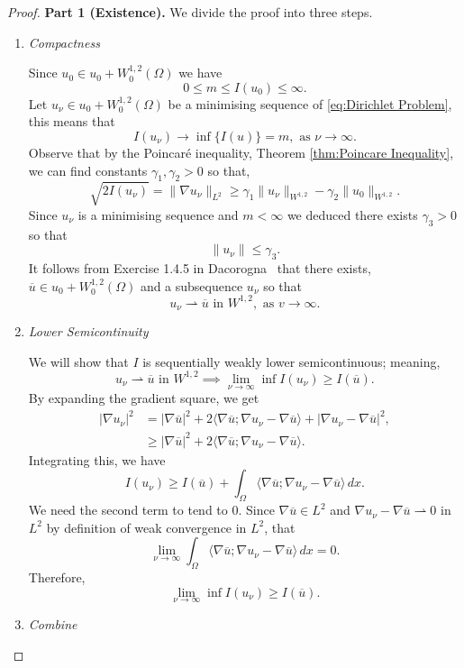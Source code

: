 \begin{proof}
    \textbf{Part 1 (Existence).}
    We divide the proof into three steps.
    
    \begin{enumerate}
        \item[(i)] \textit{Compactness}
        
        Since $u_0 \in u_0 + W_0^{1,2}(\Omega)$ we have
        $$
        	0 \le m \le I(u_0) \le \infty.
        $$
        Let $u_\nu \in u_0 + W_0^{1,2}(\Omega)$ be a minimising sequence of \eqref{eq:Dirichlet Problem}, this means that
        $$
        I(u_\nu) \rightarrow \inf\{I(u)\} = m, \text{ as } \nu\rightarrow \infty.
        $$
        Observe that by the Poincar\'e inequality, Theorem \ref{thm:Poincare Inequality}, we can find constants $\gamma_1,\gamma_2>0$ so that,
        $$
        \sqrt{2I(u_\nu)} = \|\nabla u_\nu\|_{L^2} \ge \gamma_1\|u_\nu\|
        _{W^{1,2}} - \gamma_2\|u_0\|_{W^{1,2}}.
        $$
        Since $u_\nu$ is a minimising sequence and $m<\infty$ we deduced there exists $\gamma_3 > 0$ so that
        $$
        \|u_\nu\| \le \gamma_3.
        $$
        It follows from Exercise 1.4.5 in Dacorogna~\cite[p.~47]{dacorogna} that there exists, $\overline{u} \in u_0 + W_0^{1,2}(\Omega)$ and a subsequence $u_\nu$ so that
        $$
        u_\nu \rightharpoonup \overline{u} \text{ in } W^{1,2}, \text{ as }v 
        \rightarrow \infty.
        $$
        
        \item[(ii)] \textit{Lower Semicontinuity}
        
        We will show that $I$ is sequentially weakly lower semicontinuous; meaning, 
        $$
        u_\nu \rightharpoonup \overline{u} \text{ in } W^{1,2} \implies \lim_{\nu\rightarrow\infty} \inf I(u_\nu) \ge I(\overline{u}).
        $$
        By expanding the gradient square, we get
        $$
        \begin{aligned}
        |\nabla u_\nu|^2 &= |\nabla \overline{u}|^2 + 2 \langle \nabla \overline{u}; \nabla u_\nu -  \nabla \overline{u}\rangle + |\nabla u_\nu -  \nabla \overline{u}|^2,\\
        &\ge |\nabla \overline{u}|^2 + 2 \langle \nabla \overline{u}; \nabla u_\nu -  \nabla \overline{u}\rangle.
        \end{aligned}
        $$
        Integrating this, we have
        $$
        I(u_\nu) \ge I(\overline{u}) + \int_\Omega \langle \nabla \overline{u}; \nabla u_\nu -  \nabla \overline{u} \rangle \, dx.
        $$
        We need the second term to tend to $0$. Since $\nabla \overline{u} \in L^2$ and $\nabla u_\nu -  \nabla \overline{u} \rightharpoonup 0$ in $L^2$ by definition of weak convergence in $L^2$, that
        $$
        \lim_{\nu\rightarrow\infty} \int_\Omega \langle \nabla \overline{u}; \nabla u_\nu -  \nabla \overline{u} \rangle \, dx = 0.
        $$
        Therefore,
        \[
        \lim_{\nu\rightarrow\infty} \inf I(u_\nu) \ge I(\overline{u}).
        \]
        \item[(iii)] \textit{Combine}


\end{enumerate}
\end{proof}
